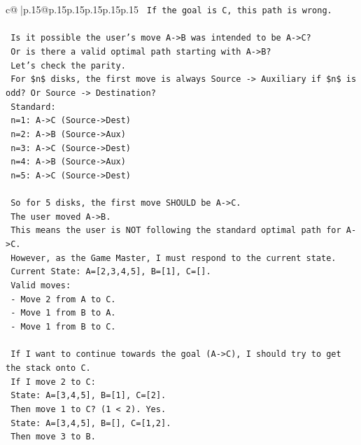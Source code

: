 \documentclass{article}
\begin{document}
{\begin{supertabular}{c@{$\;$}|p{.15\linewidth}@{}p{.15\linewidth}p{.15\linewidth}p{.15\linewidth}p{.15\linewidth}p{.15\linewidth}}
{{{\texttt{    If the goal is C, this path is wrong.} \\
\\ 
\texttt{    Is it possible the user's move A{-}>B was intended to be A{-}>C?} \\
\texttt{    Or is there a valid optimal path starting with A{-}>B?} \\
\texttt{    Let's check the parity.} \\
\texttt{    For \$n\$ disks, the first move is always Source {-}> Auxiliary if \$n\$ is odd? Or Source {-}> Destination?} \\
\texttt{    Standard:} \\
\texttt{    n=1: A{-}>C (Source{-}>Dest)} \\
\texttt{    n=2: A{-}>B (Source{-}>Aux)} \\
\texttt{    n=3: A{-}>C (Source{-}>Dest)} \\
\texttt{    n=4: A{-}>B (Source{-}>Aux)} \\
\texttt{    n=5: A{-}>C (Source{-}>Dest)} \\
\\ 
\texttt{    So for 5 disks, the first move SHOULD be A{-}>C.} \\
\texttt{    The user moved A{-}>B.} \\
\texttt{    This means the user is NOT following the standard optimal path for A{-}>C.} \\
\texttt{    However, as the Game Master, I must respond to the current state.} \\
\texttt{    Current State: A={[}2,3,4,5{]}, B={[}1{]}, C={[}{]}.} \\
\texttt{    Valid moves:} \\
\texttt{    {-} Move 2 from A to C.} \\
\texttt{    {-} Move 1 from B to A.} \\
\texttt{    {-} Move 1 from B to C.} \\
\\ 
\texttt{    If I want to continue towards the goal (A{-}>C), I should try to get the stack onto C.} \\
\texttt{    If I move 2 to C:} \\
\texttt{    State: A={[}3,4,5{]}, B={[}1{]}, C={[}2{]}.} \\
\texttt{    Then move 1 to C? (1 < 2). Yes.} \\
\texttt{    State: A={[}3,4,5{]}, B={[}{]}, C={[}1,2{]}.} \\
\texttt{    Then move 3 to B.} \\
}}}
\end{supertabular}}
\end{document}
